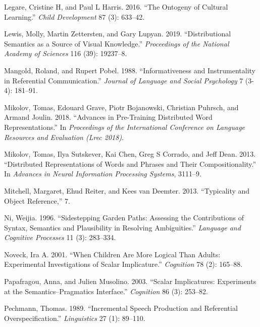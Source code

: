 \documentclass{ucetd}
\newlength{\cslhangindent}
\newenvironment{cslreferences}%
{\setlength{\parindent}{0pt}%
\everypar{\setlength{\hangindent}{\cslhangindent}}\ignorespaces}%
{\par}
\begin{document}
\begin{cslreferences}
\leavevmode\hypertarget{ref-legare2016}{}%
Legare, Cristine H, and Paul L Harris. 2016. ``The Ontogeny of Cultural
Learning.'' \emph{Child Development} 87 (3): 633--42.

\leavevmode\hypertarget{ref-lewis2019}{}%
Lewis, Molly, Martin Zettersten, and Gary Lupyan. 2019. ``Distributional
Semantics as a Source of Visual Knowledge.'' \emph{Proceedings of the
National Academy of Sciences} 116 (39): 19237--8.

\leavevmode\hypertarget{ref-mangold_informativeness_1988}{}%
Mangold, Roland, and Rupert Pobel. 1988. ``Informativeness and
Instrumentality in Referential Communication.'' \emph{Journal of
Language and Social Psychology} 7 (3-4): 181--91.

\leavevmode\hypertarget{ref-mikolov2018}{}%
Mikolov, Tomas, Edouard Grave, Piotr Bojanowski, Christian Puhrsch, and
Armand Joulin. 2018. ``Advances in Pre-Training Distributed Word
Representations.'' In \emph{Proceedings of the International Conference
on Language Resources and Evaluation (Lrec 2018)}.

\leavevmode\hypertarget{ref-mikolov2013}{}%
Mikolov, Tomas, Ilya Sutskever, Kai Chen, Greg S Corrado, and Jeff Dean.
2013. ``Distributed Representations of Words and Phrases and Their
Compositionality.'' In \emph{Advances in Neural Information Processing
Systems}, 3111--9.

\leavevmode\hypertarget{ref-mitchell_2013}{}%
Mitchell, Margaret, Ehud Reiter, and Kees van Deemter. 2013.
``Typicality and Object Reference,'' 7.

\leavevmode\hypertarget{ref-nietal}{}%
Ni, Weijia. 1996. ``Sidestepping Garden Paths: Assessing the
Contributions of Syntax, Semantics and Plausibility in Resolving
Ambiguities.'' \emph{Language and Cognitive Processes} 11 (3): 283--334.

\leavevmode\hypertarget{ref-noveck_when_2001}{}%
Noveck, Ira A. 2001. ``When Children Are More Logical Than Adults:
Experimental Investigations of Scalar Implicature.'' \emph{Cognition} 78
(2): 165--88.

\leavevmode\hypertarget{ref-papafragou_scalar_2003}{}%
Papafragou, Anna, and Julien Musolino. 2003. ``Scalar Implicatures:
Experiments at the Semantics--Pragmatics Interface.'' \emph{Cognition}
86 (3): 253--82.

\leavevmode\hypertarget{ref-pechmann_incremental_1989}{}%
Pechmann, Thomas. 1989. ``Incremental Speech Production and Referential
Overspecification.'' \emph{Linguistics} 27 (1): 89--110.


\end{cslreferences}
\end{document}
